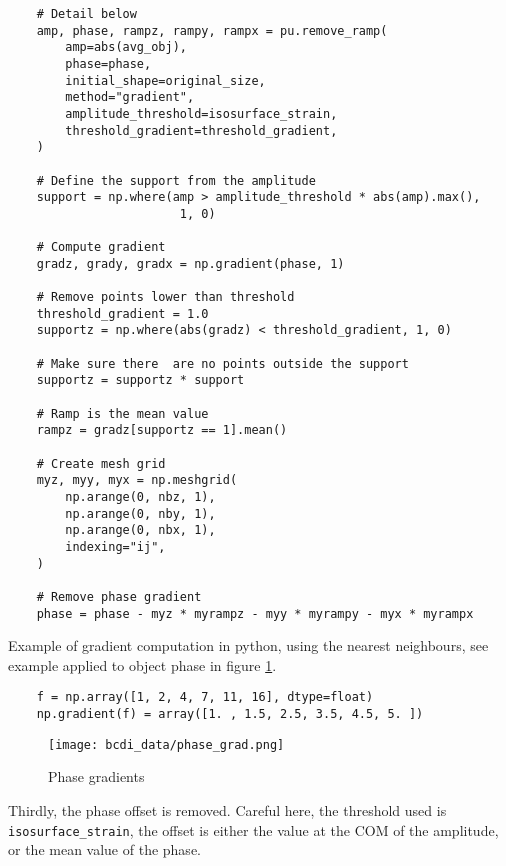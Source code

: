 \begin{verbatim}
    # Detail below
    amp, phase, rampz, rampy, rampx = pu.remove_ramp(
        amp=abs(avg_obj),
        phase=phase,
        initial_shape=original_size,
        method="gradient",
        amplitude_threshold=isosurface_strain,
        threshold_gradient=threshold_gradient,
    )
    
    # Define the support from the amplitude
    support = np.where(amp > amplitude_threshold * abs(amp).max(), 
                        1, 0)
    
    # Compute gradient
    gradz, grady, gradx = np.gradient(phase, 1)
    
    # Remove points lower than threshold
    threshold_gradient = 1.0
    supportz = np.where(abs(gradz) < threshold_gradient, 1, 0)
    
    # Make sure there  are no points outside the support
    supportz = supportz * support
    
    # Ramp is the mean value
    rampz = gradz[supportz == 1].mean()
    
    # Create mesh grid
    myz, myy, myx = np.meshgrid(
        np.arange(0, nbz, 1),
        np.arange(0, nby, 1),
        np.arange(0, nbx, 1),
        indexing="ij",
    )
    
    # Remove phase gradient
    phase = phase - myz * myrampz - myy * myrampy - myx * myrampx
\end{verbatim}

Example of gradient computation in python, using the nearest neighbours, see example applied to object phase in figure \ref{fig:phase_grad}.
\begin{verbatim}
    f = np.array([1, 2, 4, 7, 11, 16], dtype=float)
    np.gradient(f) = array([1. , 1.5, 2.5, 3.5, 4.5, 5. ])
\end{verbatim}

\begin{figure}
    \centering
    \texttt{[image: bcdi\_data/phase\_grad.png]}
    \caption{Phase gradients}
    \label{fig:phase_grad}
\end{figure}

Thirdly, the phase offset is removed. Careful here, the threshold used is \verb|isosurface_strain|, the offset is either the value at the COM of the amplitude, or the mean value of the phase.

